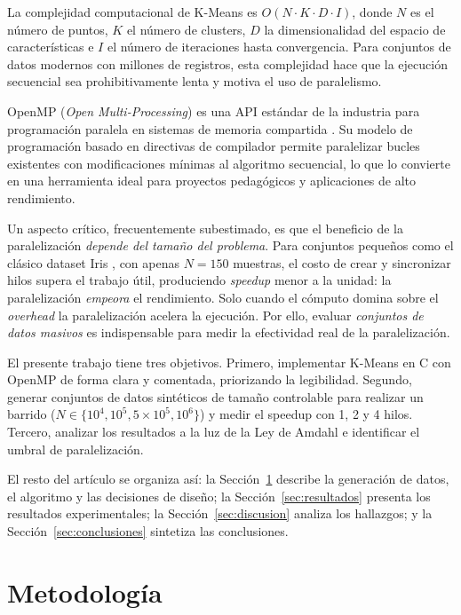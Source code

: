 \documentclass[conference]{IEEEtran}
\begin{document}
La complejidad computacional de K-Means es $O(N \cdot K \cdot D \cdot I)$,
donde $N$ es el n\'umero de puntos, $K$ el n\'umero de clusters, $D$ la
dimensionalidad del espacio de caracter\'isticas e $I$ el n\'umero de
iteraciones hasta convergencia.
Para conjuntos de datos modernos con millones de registros, esta complejidad
hace que la ejecuci\'on secuencial sea prohibitivamente lenta y motiva el uso
de paralelismo.

OpenMP (\emph{Open Multi-Processing}) es una API est\'andar de la industria
para programaci\'on paralela en sistemas de memoria compartida \cite{dagum1998}.
Su modelo de programaci\'on basado en directivas de compilador permite
paralelizar bucles existentes con modificaciones m\'inimas al algoritmo
secuencial, lo que lo convierte en una herramienta ideal para proyectos
pedag\'ogicos y aplicaciones de alto rendimiento.

Un aspecto cr\'itico, frecuentemente subestimado, es que el beneficio de la
paralelizaci\'on \emph{depende del tama\~no del problema}.
Para conjuntos peque\~nos como el cl\'asico dataset Iris \cite{fisher1936},
con apenas $N{=}150$ muestras, el costo de crear y sincronizar hilos supera
el trabajo \'util, produciendo \emph{speedup} menor a la unidad: la
paralelizaci\'on \emph{empeora} el rendimiento.
Solo cuando el c\'omputo domina sobre el \emph{overhead} la paralelizaci\'on
acelera la ejecuci\'on.
Por ello, evaluar \emph{conjuntos de datos masivos} es indispensable para
medir la efectividad real de la paralelizaci\'on.

El presente trabajo tiene tres objetivos.
Primero, implementar K-Means en C con OpenMP de forma clara y comentada,
priorizando la legibilidad.
Segundo, generar conjuntos de datos sint\'eticos de tama\~no controlable para
realizar un barrido ($N \in \{10^4, 10^5, 5{\times}10^5, 10^6\}$) y medir el
speedup con 1, 2 y 4 hilos.
Tercero, analizar los resultados a la luz de la Ley de Amdahl e identificar el
umbral de paralelizaci\'on.

El resto del art\'iculo se organiza as\'i:
la Secci\'on~\ref{sec:metodologia} describe la generaci\'on de datos, el
algoritmo y las decisiones de dise\~no; la Secci\'on~\ref{sec:resultados}
presenta los resultados experimentales; la Secci\'on~\ref{sec:discusion}
analiza los hallazgos; y la Secci\'on~\ref{sec:conclusiones} sintetiza las
conclusiones.

\section{Metodolog\'ia}
\label{sec:metodologia}
\end{document}
